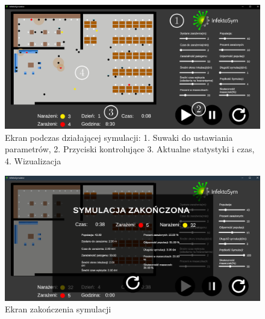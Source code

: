 \begin{itemize}
	\begin{figure}[h!]
		\includegraphics[width=\linewidth]{runningSimwithNumbers.png}
		\caption{Ekran podczas działającej symulacji: 1. Suwaki do ustawiania parametrów, 2. Przyciski kontrolujące 3. Aktualne statystyki i czas, 4. Wizualizacja}
		\label{fig:runningSim}
	\end{figure}
	
	\begin{figure}[h!]
		\includegraphics[width=\linewidth]{endSim.png}
		\caption{Ekran zakończenia symulacji}
		\label{fig:endSim}
	\end{figure}
\end{itemize}


